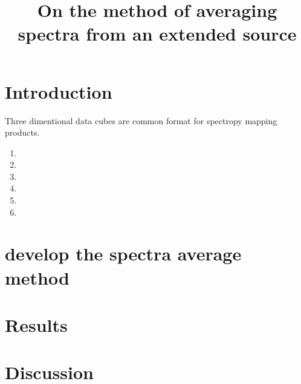 \documentclass[manuscript]{aastex61}
\begin{document}
\title{On the method of averaging spectra from an extended source }




\begin{abstract}


\end{abstract}


\section{Introduction} \label{sec:intro}
Three dimentional data cubes are common format for spectropy mapping products.

\begin{enumerate}
\item 
\item 
\item 
\item 
\item 
\item 
\end{enumerate}

\section{develop the spectra average method} \label{sec:method}
\section{Results} \label{sec:result}
\section{Discussion} \label{sec:disc}

\acknowledgments

\appendix


\end{document}
